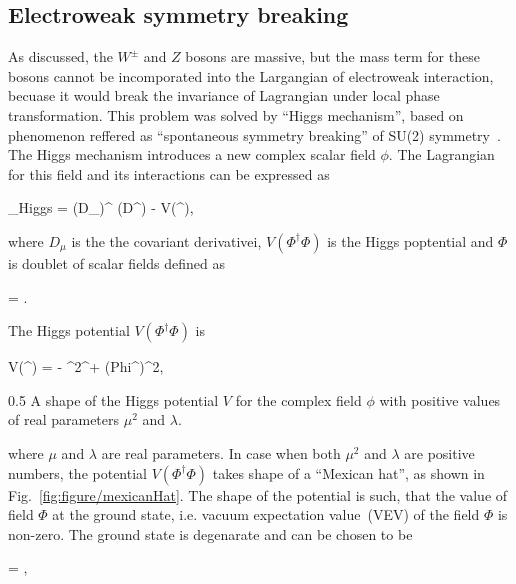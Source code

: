 \subsection{Electroweak symmetry breaking~\label{sec:EWbreaking}}

As discussed, the $W^{\pm}$ and $Z$ bosons are massive, but the mass term for these bosons cannot be incomporated into the Largangian of electroweak interaction, becuase it would break the invariance of Lagrangian under local phase transformation. This problem was solved by ``Higgs mechanism'', based on phenomenon reffered as ``spontaneous symmetry breaking'' of SU(2) symmetry~\cite{Englert:1964et, Higgs:1964ia, Guralnik:1964eu}. The Higgs mechanism introduces a new complex scalar field $\phi$. The Lagrangian for this field and its interactions can be expressed as 

{
    _{Higgs} =  (D_{\mu}\Phi)^{\dagger} (D^{\mu}\Phi) - V(\Phi^{\dagger}\Phi),
}

where $D_{\mu}$ is the the covariant derivativei, $V(\Phi^{\dagger}\Phi)$ is the Higgs poptential and $\Phi$ is doublet of scalar fields defined as


{
    \Phi = .
}

The Higgs potential $V(\Phi^{\dagger}\Phi)$ is

{
    V(\Phi^{\dagger}\Phi) =  -  \mu^{2}\Phi^{\dagger}\Phi +  \lambda(Phi^{\dagger}\Phi)^{2},
}


                 {0.5}       %
                 { A shape of the Higgs potential $V$ for the complex field $\phi$ with positive values of real parameters $\mu^{2}$ and $\lambda$.}

where $\mu$ and $\lambda$ are real parameters. In case when both $\mu^{2}$ and $\lambda$ are positive numbers, the potential $V(\Phi^{\dagger}\Phi)$ takes shape of a ``Mexican hat'', as shown in Fig.~\ref{fig:figure/mexicanHat}. The shape of the potential is such, that the value of field $\Phi$ at the ground state, i.e. vacuum expectation value~(VEV) of the field $\Phi$ is non-zero. The ground state is degenarate and can be chosen to be

{
      \rangle =  ,
}

